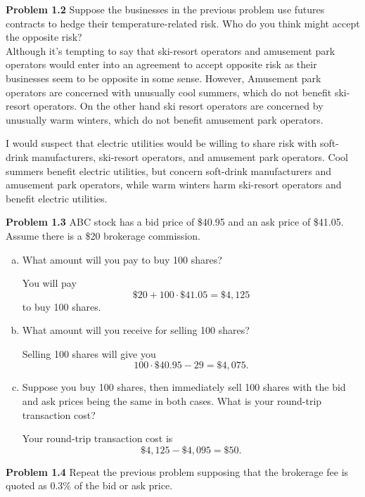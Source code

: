 \documentclass[12pt]{article}
\newcommand{\problem}[1]{\bigskip \noindent \textbf{Problem #1}}
\theoremstyle{plain}
\begin{document}
\problem{1.2} Suppose the businesses in the previous problem use futures contracts to hedge their temperature-related risk. Who do you think might accept the opposite risk?\\

Although it's tempting to say that ski-resort operators and amusement park operators would enter into an agreement to accept opposite risk as their businesses seem to be opposite in some sense. However, Amusement park operators are concerned with unusually cool summers, which do not benefit ski-resort operators. On the other hand ski resort operators are concerned by unusually warm winters, which do not benefit amusement park operators.

I would suspect that electric utilities would be willing to share risk with soft-drink manufacturers, ski-resort operators, and amusement park operators. Cool summers benefit electric utilities, but concern soft-drink manufacturers and amusement park operators, while warm winters harm ski-resort operators and benefit electric utilities.

\problem{1.3} ABC stock has a bid price of \$40.95 and an ask price of \$41.05. Assume there is a \$20 brokerage commission.

\begin{enumerate}[(a)]
\item What amount will you pay to buy 100 shares?

You will pay
\[
\$20 + 100 \cdot \$41.05 = \$4,125
\]
to buy 100 shares.

\item What amount will you receive for selling 100 shares?

Selling 100 shares will give you
\[
100\cdot \$40.95 - 29 = \$4,075.
\]

\item Suppose you buy 100 shares, then immediately sell 100 shares with the bid and ask prices being the same in both cases. What is your round-trip transaction cost?

Your round-trip transaction cost is
\[
\$4,125 - \$4,095 = \$50.
\]
\end{enumerate}

\problem{1.4} Repeat the previous problem supposing that the brokerage fee is quoted as 0.3\% of the bid or ask price.
\end{document}
